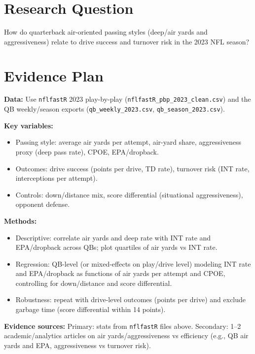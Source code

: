 \documentclass[11pt]{article}
\begin{document}
\section*{Research Question}
How do quarterback air-oriented passing styles (deep/air yards and aggressiveness) relate to drive success and turnover risk in the 2023 NFL season?

\section*{Evidence Plan}
\textbf{Data:} Use \texttt{nflfastR} 2023 play-by-play (\texttt{nflfastR\_pbp\_2023\_clean.csv}) and the QB weekly/season exports (\texttt{qb\_weekly\_2023.csv}, \texttt{qb\_season\_2023.csv}).

\textbf{Key variables:}
\begin{itemize}
  \item Passing style: average air yards per attempt, air-yard share, aggressiveness proxy (deep pass rate), CPOE, EPA/dropback.
  \item Outcomes: drive success (points per drive, TD rate), turnover risk (INT rate, interceptions per attempt).
  \item Controls: down/distance mix, score differential (situational aggressiveness), opponent defense.
\end{itemize}

\textbf{Methods:}
\begin{itemize}
  \item Descriptive: correlate air yards and deep rate with INT rate and EPA/dropback across QBs; plot quartiles of air yards vs INT rate.
  \item Regression: QB-level (or mixed-effects on play/drive level) modeling INT rate and EPA/dropback as functions of air yards per attempt and CPOE, controlling for down/distance and score differential.
  \item Robustness: repeat with drive-level outcomes (points per drive) and exclude garbage time (score differential within 14 points).
\end{itemize}

\textbf{Evidence sources:} Primary: stats from \texttt{nflfastR} files above. Secondary: 1--2 academic/analytics articles on air yards/aggressiveness vs efficiency (e.g., QB air yards and EPA, aggressiveness vs turnover risk).
\end{document}
